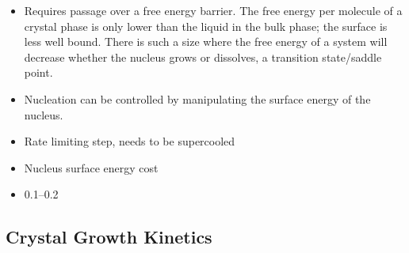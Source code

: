 \begin{itemize}

    \item Requires passage over a free energy barrier. The free energy per molecule of a crystal phase is only lower than the liquid in the bulk phase; the surface is less well bound. There is such a size where the free energy of a system will decrease whether the nucleus grows or dissolves, a transition state/saddle point.

    \item Nucleation can be controlled by manipulating the surface energy of the nucleus.~\cite{de-yoreo:03}
 
    \item Rate limiting step, needs to be supercooled
    \item Nucleus surface energy cost
    \item \SIrange{0.1}{0.2}{\poise}
\end{itemize}

\subsection{Crystal Growth Kinetics}

